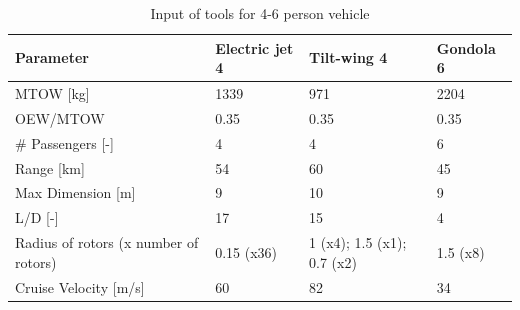 \begin{table}[H]
\centering
\captionsetup{justification=centering}
\caption{Input of tools for 4-6 person vehicle}
\label{46input}
\begin{tabular}{@{}llll@{}}
\toprule
\textbf{Parameter}                       & \textbf{Electric jet 4} & \textbf{Tilt-wing 4} & \textbf{Gondola 6} \\ \midrule
MTOW {[}kg{]}                            & 1339                   & 971                   & 2204                    \\
OEW/MTOW           & 0.35                   & 0.35                   & 0.35                    \\
\# Passengers {[}-{]}                    & 4                   &  4                  & 6                   \\
Range {[}km{]}                           & 54                   &  60                  & 45                    \\
Max Dimension {[}m{]}                    & 9                   & 10                    & 9                   \\
L/D {[}-{]}                              & 17                   & 15                   & 4                    \\
Radius of rotors (x number of rotors)      & 0.15 (x36)           & 1 (x4); 1.5 (x1); 0.7 (x2) & 1.5 (x8)                    \\
Cruise Velocity {[}m/s{]}                & 60                   & 82                    & 34                    \\ \bottomrule
\end{tabular}
\end{table}


